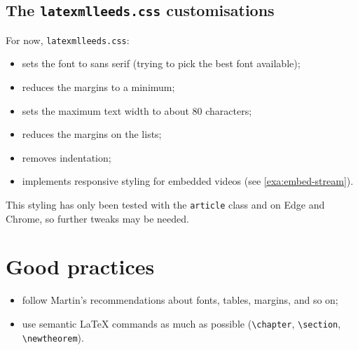 \documentclass[a4paper]{article}
\theoremstyle{definition}
\begin{document}
\subsection{The \texttt{latexmlleeds.css} customisations}
For now, \verb|latexmlleeds.css|:
\begin{itemize}
  \item sets the font to sans serif (trying to pick the best font available);
  \item reduces the margins to a minimum;
  \item sets the maximum text width to about 80 characters;
  \item reduces the margins on the lists;
  \item removes indentation;
  \item implements responsive styling for embedded videos (see \autoref{exa:embed-stream}).
\end{itemize}
This styling has only been tested with the \verb|article| class and on Edge and Chrome, so further tweaks may be needed.

\section{Good practices}
\begin{itemize}
  \item follow Martin's recommendations about fonts, tables, margins, and so on;
  \item use semantic \LaTeX{} commands as much as possible (\verb|\chapter|, \verb|\section|, \verb|\newtheorem|).
\end{itemize}
\end{document}
